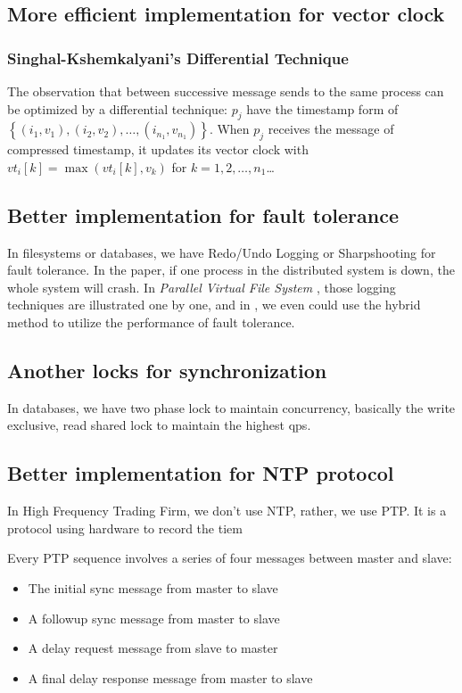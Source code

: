 \documentclass[acmlarge]{acmart}
\begin{document}
\subsection {More efficient implementation for vector clock}
\subsubsection {Singhal-Kshemkalyani’s Differential Technique}

The observation that between successive message sends to the same process can be optimized by a differential technique:
$p_j$ have the timestamp form of $\left\{\left(i_{1}, v_{1}\right),\left(i_{2}, v_{2}\right), \ldots,\left(i_{n_{1}}, v_{n_{1}}\right)\right\}$.
When $p_j$ receives the message of compressed timestamp, it updates its vector clock with $v t_{i}[k]=\max \left(v t_{i}[k], v_{k}\right)$ for $k=1,2, \ldots, n_{1}$\dots

\subsection {Better implementation for fault tolerance}
In filesystems or databases, we have Redo/Undo Logging or Sharpshooting for fault tolerance. In the paper,
if one process in the distributed system is down, the whole system will crash. In \textit{Parallel Virtual File System} \cite{carns2000pvfs}, those logging techniques are illustrated one by one,
and in \cite{choi2020libnvmmio}, we even could use the hybrid method to utilize the performance of fault tolerance.

\subsection{Another locks for synchronization}
In databases, we have two phase lock to maintain concurrency, basically the write exclusive, read shared lock to maintain the highest qps.
\subsection{Better implementation for NTP protocol}
In High Frequency Trading Firm, we don't use NTP, rather, we use PTP. It is a protocol using hardware to record the tiem
\cite{HFT-PTP-NTP} %

Every PTP sequence involves a series of four messages between master and slave:
\begin{itemize}
\item The initial sync message from master to slave
\item A followup sync message from master to slave
\item A delay request message from slave to master
\item A final delay response message from master to slave
\end{itemize}




\end{document}
